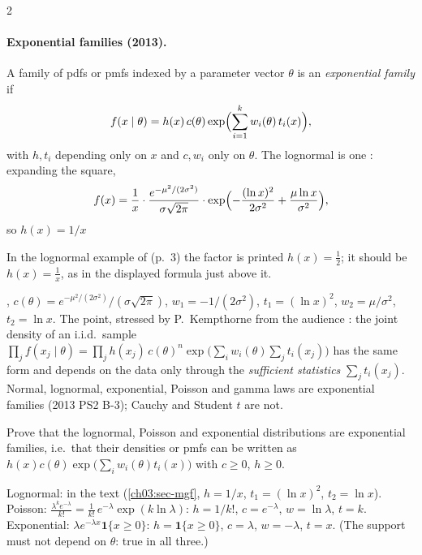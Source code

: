 \begin{paracol}{2}
\paragraph{Exponential families (2013).} A family of pdfs or pmfs indexed by a parameter vector $\theta$ is an
\emph{exponential family} if 
\[
  f(x\mid\theta)=h(x)\,c(\theta)\exp\Bigl(\sum_{i=1}^kw_i(\theta)\,t_i(x)\Bigr),
\]
with $h,t_i$ depending only on $x$ and $c,w_i$ only on $\theta$. The lognormal is one :
expanding the square,
\[
  f(x)=\frac1x\cdot\frac{e^{-\mu^2/(2\sigma^2)}}{\sigma\sqrt{2\pi}}\cdot\exp\Bigl(-\frac{(\ln x)^2}{2\sigma^2}+\frac{\mu\ln x}{\sigma^2}\Bigr),
\]
so $h(x)=1/x$\begin{coursenote}
In the lognormal example of  (p.~3) the factor is printed $h(x)=\frac12$; it should be
$h(x)=\frac1x$, as in the displayed formula just above it.
\end{coursenote}, $c(\theta)=e^{-\mu^2/(2\sigma^2)}/(\sigma\sqrt{2\pi})$, $w_1=-1/(2\sigma^2)$, $t_1=(\ln x)^2$, $w_2=\mu/\sigma^2$,
$t_2=\ln x$. The point, stressed by P.~Kempthorne from the audience : the joint density of an
i.i.d.\ sample $\prod_jf(x_j\mid\theta)=\prod_jh(x_j)\,c(\theta)^n\exp\bigl(\sum_iw_i(\theta)\sum_jt_i(x_j)\bigr)$ has the
same form and depends on the data only through the \emph{sufficient statistics} $\sum_jt_i(x_j)$. Normal,
lognormal, exponential, Poisson and gamma laws are exponential families (2013 PS2 B-3); Cauchy and Student $t$
are not.

\begin{exercise}\label{ch03:ex-expfam}
Prove that the lognormal, Poisson and exponential distributions are exponential families, i.e.\ that their
densities or pmfs can be written as $h(x)c(\theta)\exp\bigl(\sum_iw_i(\theta)t_i(x)\bigr)$ with $c\ge0$, $h\ge0$.
\end{exercise}
\begin{solution}[ch03:ex-expfam]
Lognormal: in the text (\cref{ch03:sec-mgf}, $h=1/x$, $t_1=(\ln x)^2$, $t_2=\ln x$). Poisson: $\frac{\lambda^ke^{-\lambda}}{k!}=\frac1{k!}\,e^{-\lambda}
\exp(k\ln\lambda)$: $h=1/k!$, $c=e^{-\lambda}$, $w=\ln\lambda$, $t=k$. Exponential: $\lambda e^{-\lambda x}\mathbf 1\{x\ge0\}$: $h=\mathbf 1\{x\ge0\}$,
$c=\lambda$, $w=-\lambda$, $t=x$. (The support must not depend on $\theta$: true in all three.)
\end{solution}


\end{paracol}
